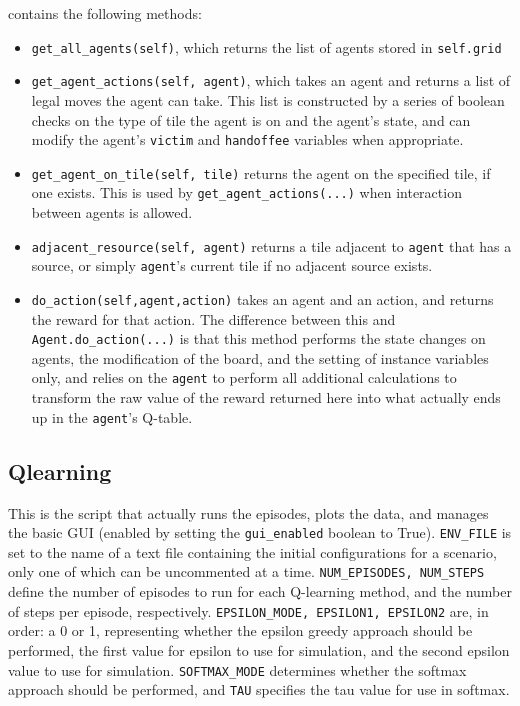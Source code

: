 \documentclass[11pt]{article}
\begin{document}
 contains the following methods:

\begin{itemize}
\item \texttt{get_all_agents(self)}, which returns the list of agents stored in \texttt{self.grid}
\item \texttt{get_agent_actions(self, agent)}, which takes an agent and returns a list of legal moves the agent can take. This list is constructed by a series of boolean checks on the type of tile the agent is on and the agent's state, and can modify the agent's \texttt{victim} and \texttt{handoffee} variables when appropriate.
\item \texttt{get_agent_on_tile(self, tile)} returns the agent on the specified tile, if one exists. This is used by \texttt{get_agent_actions(...)} when interaction between agents is allowed.
\item \texttt{adjacent_resource(self, agent)} returns a tile adjacent to \texttt{agent} that has a source, or simply \texttt{agent}'s current tile if no adjacent source exists.
\item \texttt{do_action(self,agent,action)} takes an agent and an action, and returns the reward for that action. The difference between this and \texttt{Agent.do_action(...)} is that this method performs the state changes on agents, the modification of the board, and the setting of instance variables only, and relies on the \texttt{agent} to perform all additional calculations to transform the raw value of the reward returned here into what actually ends up in the \texttt{agent}'s Q-table.
\end{itemize}

  
\subsection{Qlearning}

This is the script that actually runs the episodes, plots the data, and manages the basic GUI (enabled by setting the \texttt{gui_enabled} boolean to True). \texttt{ENV_FILE} is set to the name of a text file containing the initial configurations for a scenario, only one of which can be uncommented at a time. \texttt{NUM_EPISODES, NUM_STEPS} define the number of episodes to run for each Q-learning method, and the number of steps per episode, respectively. \texttt{EPSILON_MODE, EPSILON1, EPSILON2} are, in order: a 0 or 1, representing whether the epsilon greedy approach should be performed, the first value for epsilon to use for simulation, and the second epsilon value to use for simulation. \texttt{SOFTMAX_MODE} determines whether the softmax approach should be performed, and \texttt{TAU} specifies the tau value for use in softmax.
\end{document}
